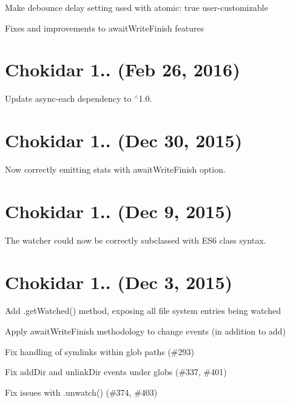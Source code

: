 \begin{DoxyItemize}
\item Make debounce delay setting used with {\ttfamily atomic\+: true} user-\/customizable
\item Fixes and improvements to {\ttfamily await\+Write\+Finish} features
\end{DoxyItemize}

\section*{Chokidar 1.. (Feb 26, 2016)}


\begin{DoxyItemize}
\item Update async-\/each dependency to $^\wedge$1.0.
\end{DoxyItemize}

\section*{Chokidar 1.. (Dec 30, 2015)}


\begin{DoxyItemize}
\item Now correctly emitting {\ttfamily stats} with {\ttfamily await\+Write\+Finish} option.
\end{DoxyItemize}

\section*{Chokidar 1.. (Dec 9, 2015)}


\begin{DoxyItemize}
\item The watcher could now be correctly subclassed with E\+S6 class syntax.
\end{DoxyItemize}

\section*{Chokidar 1.. (Dec 3, 2015)}


\begin{DoxyItemize}
\item Add {\ttfamily .get\+Watched()} method, exposing all file system entries being watched
\item Apply {\ttfamily await\+Write\+Finish} methodology to {\ttfamily change} events (in addition to {\ttfamily add})
\item Fix handling of symlinks within glob paths (\#293)
\item Fix {\ttfamily add\+Dir} and {\ttfamily unlink\+Dir} events under globs (\#337, \#401)
\item Fix issues with {\ttfamily .unwatch()} (\#374, \#403)
\end{DoxyItemize}

